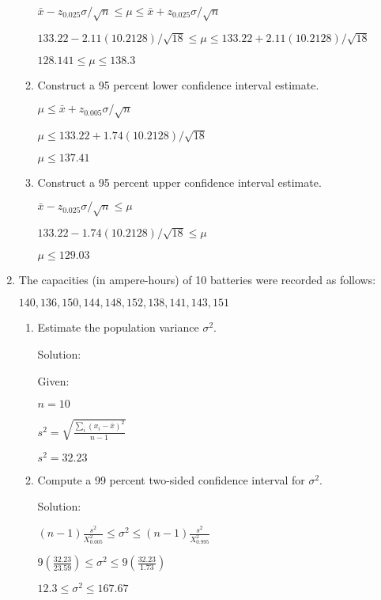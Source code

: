\documentclass{article}
\begin{document}
\begin{enumerate}
\begin{enumerate}
        $\bar{x} - z_{0.025}\sigma/\sqrt{n} \leq \mu \leq \bar{x} + z_{0.025}\sigma/\sqrt{n}$

        $133.22 - 2.11(10.2128)/\sqrt{18} \leq \mu \leq 133.22 + 2.11(10.2128)/\sqrt{18}$

        $128.141 \leq \mu \leq 138.3$

        \item Construct a 95 percent lower confidence interval estimate.
        
        $\mu \leq \bar{x} + z_{0.005}\sigma/\sqrt{n}$

        $\mu \leq 133.22 + 1.74(10.2128)/\sqrt{18}$

        $\mu \leq 137.41$

        \item Construct a 95 percent upper confidence interval estimate.
        
        $\bar{x} - z_{0.025}\sigma/\sqrt{n} \leq \mu$

        $133.22 - 1.74(10.2128)/\sqrt{18} \leq \mu$

        $\mu \leq 129.03$

    \end{enumerate}
    \item The capacities (in ampere-hours) of 10 batteries were recorded as follows:
    
    $140, 136, 150, 144, 148, 152, 138, 141, 143, 151$

    \begin{enumerate}
        \item Estimate the population variance $\sigma^2$.
        
        Solution: 

        Given:
        
        $n = 10$

        $\displaystyle s^2=\sqrt{\frac{\sum_i{(x_i-\bar{x})^2}}{n-1}}$

        $s^2 = 32.23$

        \item Compute a 99 percent two-sided confidence interval for $\sigma^2$.
        
        Solution: 

        $(n-1)\frac{s^2}{X_{0.005}^2} \leq \sigma^2 \leq (n-1)\frac{s^2}{X_{0.995}^2}$

        $\displaystyle 9\left(\frac{32.23}{23.59}\right) \leq \sigma^2 \leq 9\left(\frac{32.23}{1.73}\right)$

        $12.3 \leq \sigma^2 \leq 167.67$


\end{enumerate}
\end{enumerate}
\end{document}

